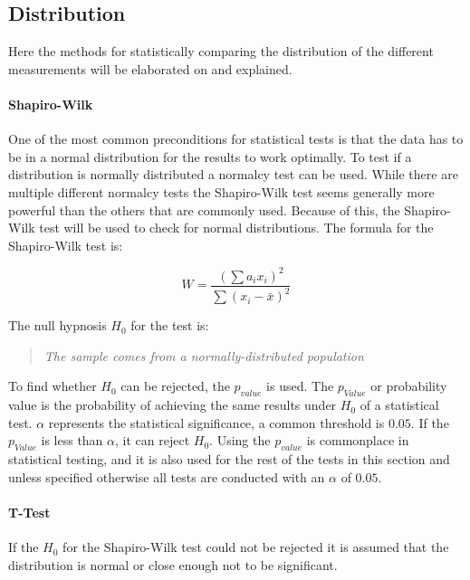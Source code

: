 \subsection{Distribution}
Here the methods for statistically comparing the distribution of the different measurements will be elaborated on and explained.

\paragraph{Shapiro-Wilk}
One of the most common preconditions for statistical tests is that the data has to be in a normal distribution for the results to work optimally. To test if a distribution is normally distributed a normalcy test can be used. While there are multiple different normalcy tests the Shapiro-Wilk test seems generally more powerful than the others that are commonly used.\cite{razali2011power} Because of this, the Shapiro-Wilk test will be used to check for normal distributions. The formula for the Shapiro-Wilk test is:

\begin{equation}
    W=\frac{( \sum{a_i x_i} )^2}{\sum{(x_i - \bar{x})^2}}
\end{equation}

The null hypnosis $H_0$ for the test is:

\begin{quotation}
    \textit{The sample comes from a normally-distributed population}
\end{quotation}

To find whether $H_0$ can be rejected, the $p_{value}$ is used. The $p_{Value}$ or probability value is the probability of achieving the same results under $H_0$ of a statistical test. $\alpha$ represents the statistical significance, a common threshold is $0.05$. If the $p_{Value}$ is less than $\alpha$, it can reject $H_0$. Using the $p_{value}$ is commonplace in statistical testing\cite{greenland2016statistical}, and it is also used for the rest of the tests in this section and unless specified otherwise all tests are conducted with an $\alpha$ of $0.05$.

\paragraph{T-Test}

If the $H_0$ for the Shapiro-Wilk test could not be rejected it is assumed that the distribution is normal or close enough not to be significant.

